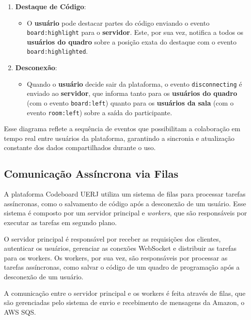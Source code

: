 \begin{enumerate}
    \item \textbf{Destaque de Código}:
    \begin{itemize}
        \item O \textbf{usuário} pode destacar partes do código enviando o evento \texttt{board:highlight} para o \textbf{servidor}. Este, por sua vez, notifica a todos os \textbf{usuários do quadro} sobre a posição exata do destaque com o evento \texttt{board:highlighted}.
    \end{itemize}

    \item \textbf{Desconexão}:
    \begin{itemize}
        \item Quando o \textbf{usuário} decide sair da plataforma, o evento \texttt{disconnecting} é enviado ao \textbf{servidor}, que informa tanto para os \textbf{usuários do quadro} (com o evento \texttt{board:left}) quanto para os \textbf{usuários da sala} (com o evento \texttt{room:left}) sobre a saída do participante.
    \end{itemize}
\end{enumerate}

Esse diagrama reflete a sequência de eventos que possibilitam a colaboração em tempo real entre usuários da plataforma, garantindo a sincronia e atualização constante dos dados compartilhados durante o uso.


\subsection{Comunicação Assíncrona via Filas}

A plataforma Codeboard UERJ utiliza um sistema de filas para processar tarefas assíncronas, como o salvamento de código após a desconexão de um usuário. Esse sistema é composto por um servidor principal e \emph{workers}, que são responsáveis por executar as tarefas em segundo plano.

O servidor principal é responsável por receber as requisições dos clientes, autenticar os usuários, gerenciar as conexões WebSocket e distribuir as tarefas para os workers. Os workers, por sua vez, são responsáveis por processar as tarefas assíncronas, como salvar o código de um quadro de programação após a desconexão de um usuário.

A comunicação entre o servidor principal e os workers é feita através de filas, que são gerenciadas pelo sistema de envio e recebimento de mensagens da Amazon, o AWS SQS. 

